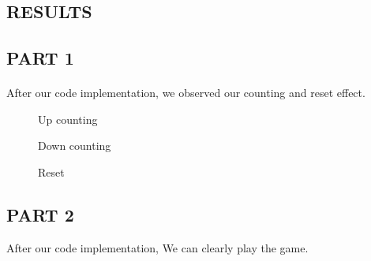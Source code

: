 \documentclass[pdftex,12pt,a4paper]{article}
\begin{document}
\begin{flushleft}
\end{flushleft}



\begin{flushleft}
\newpage
\section{RESULTS}
\subsection{PART 1}
\paragraph{}
After our code implementation, we observed our counting and reset effect.
\begin{figure}[H]
    \centering
    \caption{Up counting}
    \label{fig:part1-simulation}
\end{figure}

\begin{figure}[H]
    \centering
    \caption{Down counting}
    \label{fig:part1-simulation}
\end{figure}


\begin{figure}[H]
    \centering
    \caption{Reset}
    \label{fig:part1-simulation}
\end{figure}

\newpage
\subsection{PART 2}
After our code implementation, We can clearly play the game.


\end{flushleft}
\end{document}
